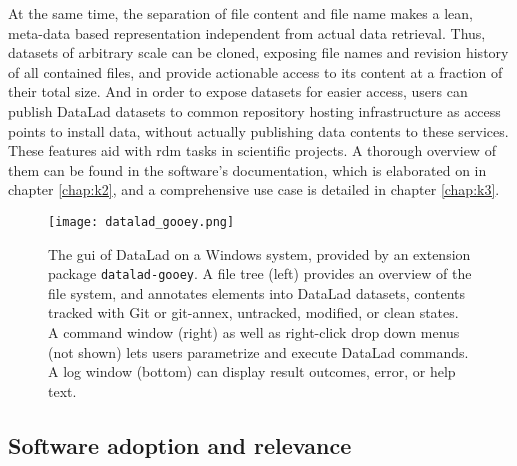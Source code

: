 {At the same time, the separation of file content and file name makes a lean, meta-data based representation independent from actual data retrieval.
Thus, datasets of arbitrary scale can be cloned, exposing file names and revision history of all contained files, and provide actionable access to its content at a fraction of their total size.
And in order to expose datasets for easier access, users can publish DataLad datasets to common repository hosting infrastructure as access points to install data, without actually publishing data contents to these services.
These features aid with \gls{rdm} tasks in scientific projects.
A thorough overview of them can be found in the software's documentation, which is elaborated on in chapter \ref{chap:k2}, and a comprehensive use case is detailed in chapter \ref{chap:k3}.

\begin{figure}
	\centering
	\texttt{[image: datalad\_gooey.png]}
	\caption[DataLad: Graphical User Interface]{The \gls{gui} of DataLad on a Windows system, provided by an extension package \texttt{datalad-gooey}. A file tree (left) provides an overview of the file system, and annotates elements into DataLad datasets, contents tracked with Git or git-annex, untracked, modified, or clean states. A command window (right) as well as right-click drop down menus (not shown) lets users parametrize and execute DataLad commands. A log window (bottom) can display result outcomes, error, or help text.}
	\label{fig:gooey}
\end{figure}



\subsection{Software adoption and relevance}

}
